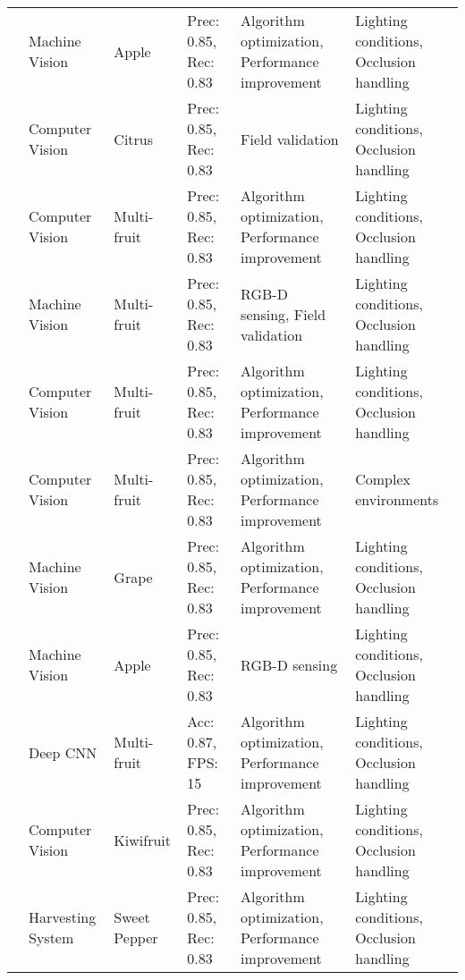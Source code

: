 \begin{table*}[htbp]
\begin{tabular}{@{}p{}p{}p{}p{}p{}p{}@{}}
\cite{apple2020} & Machine Vision & Apple & Prec: 0.85, Rec: 0.83 & Algorithm optimization, Performance improvement & Lighting conditions, Occlusion handling \\
\cite{vision2021} & Computer Vision & Citrus & Prec: 0.85, Rec: 0.83 & Field validation & Lighting conditions, Occlusion handling \\
\cite{tang2020recognition} & Computer Vision & Multi-fruit & Prec: 0.85, Rec: 0.83 & Algorithm optimization, Performance improvement & Lighting conditions, Occlusion handling \\
\cite{harvest2021} & Machine Vision & Multi-fruit & Prec: 0.85, Rec: 0.83 & RGB-D sensing, Field validation & Lighting conditions, Occlusion handling \\
\cite{robot2022} & Computer Vision & Multi-fruit & Prec: 0.85, Rec: 0.83 & Algorithm optimization, Performance improvement & Lighting conditions, Occlusion handling \\
\cite{robot2017} & Computer Vision & Multi-fruit & Prec: 0.85, Rec: 0.83 & Algorithm optimization, Performance improvement & Complex environments \\
\cite{harvest2017} & Machine Vision & Grape & Prec: 0.85, Rec: 0.83 & Algorithm optimization, Performance improvement & Lighting conditions, Occlusion handling \\
\cite{apple2022} & Machine Vision & Apple & Prec: 0.85, Rec: 0.83 & RGB-D sensing & Lighting conditions, Occlusion handling \\
\cite{robot2020} & Deep CNN & Multi-fruit & Acc: 0.87, FPS: 15 & Algorithm optimization, Performance improvement & Lighting conditions, Occlusion handling \\
\cite{vision2021} & Computer Vision & Kiwifruit & Prec: 0.85, Rec: 0.83 & Algorithm optimization, Performance improvement & Lighting conditions, Occlusion handling \\
\cite{harvest2021} & Harvesting System & Sweet Pepper & Prec: 0.85, Rec: 0.83 & Algorithm optimization, Performance improvement & Lighting conditions, Occlusion handling \\
\bottomrule
\end{tabular}
\end{table*}